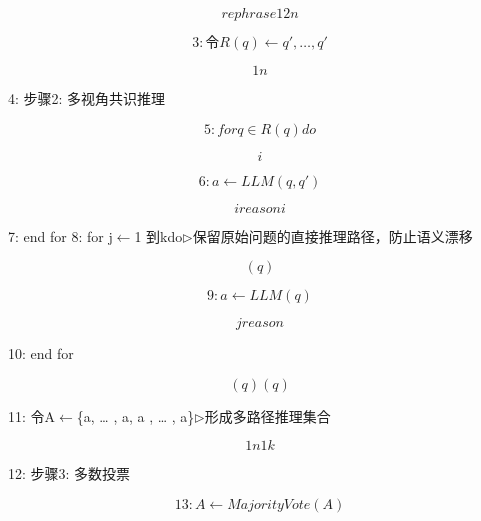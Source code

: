 \documentclass[12pt,a4paper,openright,UTF8]{ctexbook}
\begin{document}
\begin{equation*}
rephrase12n
\end{equation*}

\begin{equation*}
3: 令R(q) \leftarrow{q', \ldots , q'}
\end{equation*}

\begin{equation*}
1n
\end{equation*}

4: 步骤2: 多视角共识推理

\begin{equation*}
5: for q\in R(q) do
\end{equation*}

\begin{equation*}
i
\end{equation*}

\begin{equation*}
6:a\leftarrow LLM(q, q')
\end{equation*}

\begin{equation*}
ireasoni
\end{equation*}

7: end for 8: for j$\leftarrow$1 到kdo$\triangleright$保留原始问题的直接推理路径，防止语义漂移

\begin{equation*}
(q)
\end{equation*}

\begin{equation*}
9:a\leftarrow LLM(q)
\end{equation*}

\begin{equation*}
jreason
\end{equation*}

10: end for

\begin{equation*}
(q)(q)
\end{equation*}

11: 令A$\leftarrow$\{a, … , a, a , … , a\}$\triangleright$形成多路径推理集合

\begin{equation*}
1n1k
\end{equation*}

12: 步骤3: 多数投票

\begin{equation*}
13: A\leftarrow MajorityVote(A)
\end{equation*}
\end{document}
